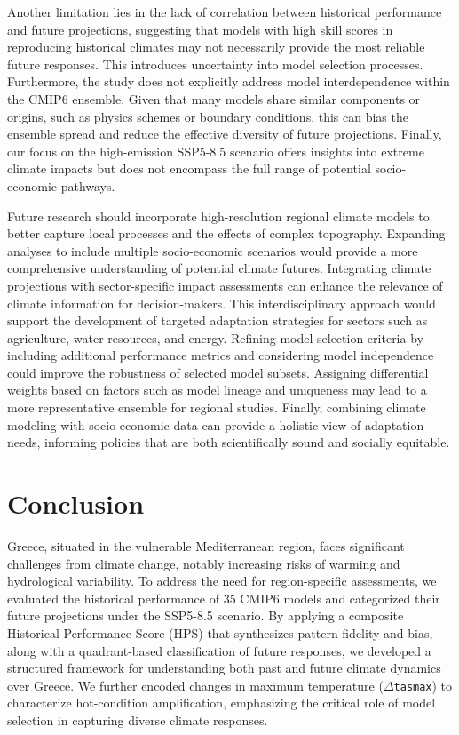 \documentclass[pdflatex,sn-chicago]{sn-jnl}%
\theoremstyle{thmstyleone}%
\theoremstyle{thmstyletwo}%
\theoremstyle{thmstylethree}%
\begin{document}
Another limitation lies in the lack of correlation between historical performance and future projections, suggesting that models with high skill scores in reproducing historical climates may not necessarily provide the most reliable future responses. This introduces uncertainty into model selection processes. Furthermore, the study does not explicitly address model interdependence within the CMIP6 ensemble. Given that many models share similar components or origins, such as physics schemes or boundary conditions, this can bias the ensemble spread and reduce the effective diversity of future projections. Finally, our focus on the high-emission SSP5-8.5 scenario offers insights into extreme climate impacts but does not encompass the full range of potential socio-economic pathways.

Future research should incorporate high-resolution regional climate models to better capture local processes and the effects of complex topography. Expanding analyses to include multiple socio-economic scenarios would provide a more comprehensive understanding of potential climate futures. Integrating climate projections with sector-specific impact assessments can enhance the relevance of climate information for decision-makers. This interdisciplinary approach would support the development of targeted adaptation strategies for sectors such as agriculture, water resources, and energy. Refining model selection criteria by including additional performance metrics and considering model independence could improve the robustness of selected model subsets. Assigning differential weights based on factors such as model lineage and uniqueness may lead to a more representative ensemble for regional studies. Finally, combining climate modeling with socio-economic data can provide a holistic view of adaptation needs, informing policies that are both scientifically sound and socially equitable.


\section{Conclusion}\label{sec5}
Greece, situated in the vulnerable Mediterranean region, faces significant challenges from climate change, notably increasing risks of warming and hydrological variability. To address the need for region-specific assessments, we evaluated the historical performance of 35 CMIP6 models and categorized their future projections under the SSP5-8.5 scenario. By applying a composite Historical Performance Score (HPS) that synthesizes pattern fidelity and bias, along with a quadrant-based classification of future responses, we developed a structured framework for understanding both past and future climate dynamics over Greece. We further encoded changes in maximum temperature (\(\Delta\)\texttt{tasmax}) to characterize hot-condition amplification, emphasizing the critical role of model selection in capturing diverse climate responses.
\end{document}

